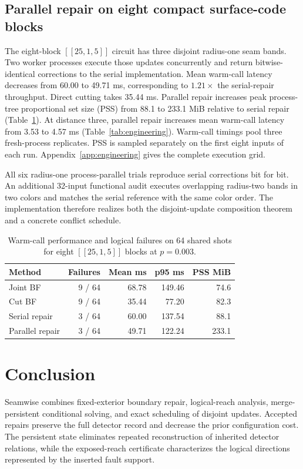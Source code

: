 \subsection{Parallel repair on eight compact surface-code blocks}
The eight-block $[[25,1,5]]$ circuit has three disjoint radius-one seam bands. Two worker processes execute those updates concurrently and return bitwise-identical corrections to the serial implementation. Mean warm-call latency decreases from 60.00 to 49.71 ms, corresponding to $1.21\times$ the serial-repair throughput. Direct cutting takes 35.44 ms. Parallel repair increases peak process-tree proportional set size (PSS) from 88.1 to 233.1 MiB relative to serial repair (Table~\ref{tab:parallel}). At distance three, parallel repair increases mean warm-call latency from 3.53 to 4.57 ms (Table~\ref{tab:engineering}). Warm-call timings pool three fresh-process replicates. PSS is sampled separately on the first eight inputs of each run. Appendix~\ref{app:engineering} gives the complete execution grid.

All six radius-one process-parallel trials reproduce serial corrections bit for bit. An additional 32-input functional audit executes overlapping radius-two bands in two colors and matches the serial reference with the same color order. The implementation therefore realizes both the disjoint-update composition theorem and a concrete conflict schedule.
\begin{table}[t]\centering\small
\caption{Warm-call performance and logical failures on 64 shared shots for eight $[[25,1,5]]$ blocks at $p=0.003$.}\label{tab:parallel}
\begin{tabular}{lrrrr}\toprule
Method&Failures&Mean ms&p95 ms&PSS MiB\\\midrule
Joint BF&9 / 64&68.78&149.46&74.6\\
Cut BF&9 / 64&35.44&77.20&82.3\\
Serial repair&3 / 64&60.00&137.54&88.1\\
Parallel repair&3 / 64&49.71&122.24&233.1\\\bottomrule
\end{tabular}\end{table}



\section{Conclusion}
Seamwise combines fixed-exterior boundary repair, logical-reach analysis, merge-persistent conditional solving, and exact scheduling of disjoint updates. Accepted repairs preserve the full detector record and decrease the prior configuration cost. The persistent state eliminates repeated reconstruction of inherited detector relations, while the exposed-reach certificate characterizes the logical directions represented by the inserted fault support.

